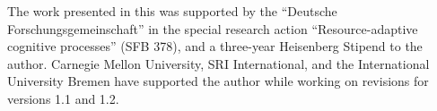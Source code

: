The work presented in this {\report} was supported by the ``Deutsche
For\-schungs\-gemeinschaft'' in the special research action
``Resource-adaptive cognitive processes'' (SFB 378), and a
three-year Heisenberg Stipend to the author.  Carnegie Mellon
University, SRI International, and the International University
Bremen have supported the author while working on revisions for
versions 1.1 and 1.2.



